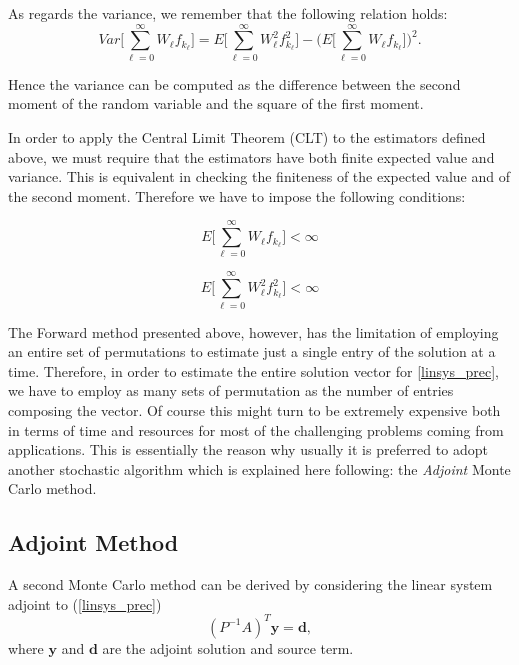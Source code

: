 \documentclass[a4paper,10pt]{article}
\begin{document}
As regards the variance, we remember that the following relation holds:
\begin{equation}
Var\bigg [\sum_{\ell=0}^\infty W_{\ell}
f_{k_{\ell}}\bigg]=E\bigg[\sum_{\ell=0}^\infty W_{\ell}^2
f_{k_{\ell}}^2\bigg] - \bigg (E\bigg[\sum_{\ell=0}^\infty W_{\ell}
f_{k_{\ell}}\bigg]\bigg )^2.
\label{dir_var}
\end{equation}

Hence the variance can be computed as the difference between the second
moment of the random variable and the square of the first moment.\newline

In order to apply the Central Limit Theorem (CLT) to the estimators defined
above, we must require that
the estimators have both finite expected value and variance. This is
equivalent in
checking the finiteness of the expected value and of the second moment.
Therefore we have to impose the following conditions:

\begin{equation}
 E\bigg[\sum_{\ell=0}^\infty W_{\ell} f_{k_{\ell}}\bigg]<\infty
\end{equation}

\begin{equation}
 E\bigg[\sum_{\ell=0}^\infty W_{\ell}^2
f_{k_{\ell}}^2\bigg]<\infty
\end{equation}

The Forward method presented above, however, has the limitation of employing an
entire set of permutations to estimate just a single entry of
the solution at a time. Therefore, in order to estimate the entire solution
vector for \ref{linsys_prec}, we have to employ as many sets of permutation as
the number of entries composing the vector. Of course this might turn to be
extremely expensive both in terms of time and resources for most of the
challenging problems coming from applications. This is essentially the reason
why usually it is preferred to adopt another stochastic algorithm which is
explained here following: the \textit{Adjoint} Monte Carlo method.

\subsection{Adjoint Method}

A second Monte Carlo method can be derived by considering the linear system
adjoint to (\ref{linsys_prec})
\begin{equation}
(P^{-1}A)^T\mathbf{y}=\mathbf{d},
\label{adj}
\end{equation}
where $\mathbf{y}$ and $\mathbf{d}$ are the adjoint solution and source term.
\end{document}
